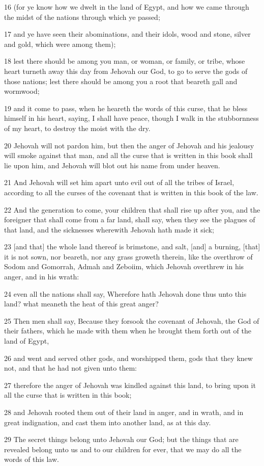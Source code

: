 \par 16 (for ye know how we dwelt in the land of Egypt, and how we came through the midst of the nations through which ye passed;
\par 17 and ye have seen their abominations, and their idols, wood and stone, silver and gold, which were among them);
\par 18 lest there should be among you man, or woman, or family, or tribe, whose heart turneth away this day from Jehovah our God, to go to serve the gods of those nations; lest there should be among you a root that beareth gall and wormwood;
\par 19 and it come to pass, when he heareth the words of this curse, that he bless himself in his heart, saying, I shall have peace, though I walk in the stubbornness of my heart, to destroy the moist with the dry.
\par 20 Jehovah will not pardon him, but then the anger of Jehovah and his jealousy will smoke against that man, and all the curse that is written in this book shall lie upon him, and Jehovah will blot out his name from under heaven.
\par 21 And Jehovah will set him apart unto evil out of all the tribes of Israel, according to all the curses of the covenant that is written in this book of the law.
\par 22 And the generation to come, your children that shall rise up after you, and the foreigner that shall come from a far land, shall say, when they see the plagues of that land, and the sicknesses wherewith Jehovah hath made it sick;
\par 23 [and that] the whole land thereof is brimstone, and salt, [and] a burning, [that] it is not sown, nor beareth, nor any grass groweth therein, like the overthrow of Sodom and Gomorrah, Admah and Zeboiim, which Jehovah overthrew in his anger, and in his wrath:
\par 24 even all the nations shall say, Wherefore hath Jehovah done thus unto this land? what meaneth the heat of this great anger?
\par 25 Then men shall say, Because they forsook the covenant of Jehovah, the God of their fathers, which he made with them when he brought them forth out of the land of Egypt,
\par 26 and went and served other gods, and worshipped them, gods that they knew not, and that he had not given unto them:
\par 27 therefore the anger of Jehovah was kindled against this land, to bring upon it all the curse that is written in this book;
\par 28 and Jehovah rooted them out of their land in anger, and in wrath, and in great indignation, and cast them into another land, as at this day.
\par 29 The secret things belong unto Jehovah our God; but the things that are revealed belong unto us and to our children for ever, that we may do all the words of this law.

